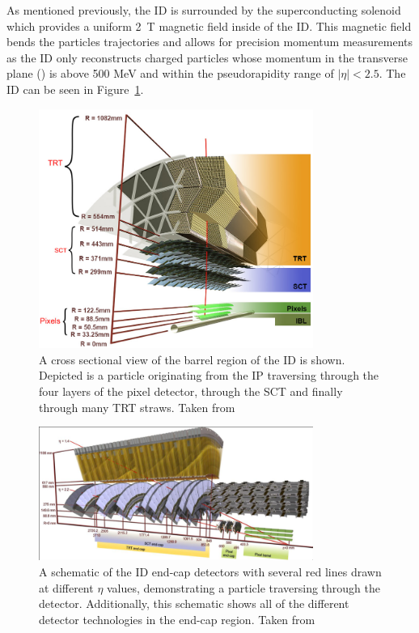As mentioned previously, the ID is surrounded by the superconducting solenoid which provides a uniform 2~T magnetic field inside of the ID\@. This magnetic field bends the particles trajectories and allows for precision momentum measurements as the ID only reconstructs charged particles whose momentum in the transverse plane (\pt) is above 500 MeV and within the pseudorapidity range of $|\eta| < 2.5$. The ID can be seen in Figure~\ref{fig:atlas_id}.

\begin{figure}
    \centering
    \includegraphics[width=0.8\textwidth]{figures/atlas/atlas_ID.png}
    \caption{A cross sectional view of the barrel region of the ID is shown. Depicted is a particle originating from the IP traversing through the four layers of the pixel detector, through the SCT and finally through many TRT straws. Taken from~\cite{atlas_inner_detector_image}}\label{fig:atlas_id}
\end{figure}

\begin{figure}
    \centering
    \includegraphics[width=0.8\textwidth]{figures/atlas/atlas_ID_endcap.png}
    \caption{A schematic of the ID end-cap detectors with several red lines drawn at different $\eta$ values, demonstrating a particle traversing through the detector. Additionally, this schematic shows all of the different detector technologies in the end-cap region. Taken from~\cite{atlas_inner_detector_endcap_image}}\label{fig:atlas_id_endcap}
\end{figure}
